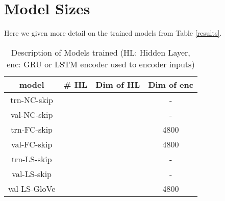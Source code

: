 \documentclass[11pt,a4paper]{article}
\begin{document}
\vspace{-4mm}












\clearpage

\appendix

\section{Model Sizes}
Here we given more detail on the trained models from Table \ref{results}.

\begin{table}[h!]
\begin{center}
\begin{tabular}{|c|c|c|c|}
\hline \bf model & \bf \# HL & \bf Dim of HL & \bf Dim of enc\\ \hline
trn-NC-skip &  &  & - \\
val-NC-skip &  &  & -\\ \hline
trn-FC-skip &  &  & 4800\\
val-FC-skip &  &  & 4800\\ \hline
trn-LS-skip &  &  & - \\
val-LS-skip &  &  & - \\
val-LS-GloVe &  &  & 4800 \\
\hline
\end{tabular}
\end{center}
\caption{\label{details} Description of Models trained (HL: Hidden Layer, enc: GRU or LSTM encoder used to encoder inputs)}
\end{table}
\end{document}
